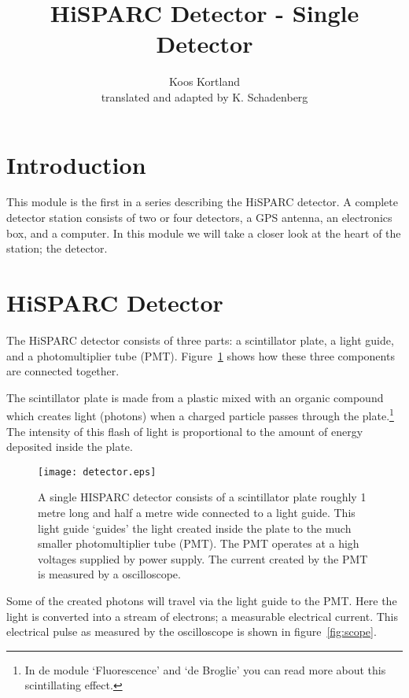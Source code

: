 


\author{Koos Kortland \\ translated and adapted by K. Schadenberg}
\date{}
\title{HiSPARC Detector - Single Detector}



\maketitle

\section{Introduction}
This module is the first in a series describing the HiSPARC detector. A complete detector station consists of two or four detectors, a GPS antenna, an electronics box, and a computer. In this module we will take a closer look at the heart of the station; the detector. 

\section{HiSPARC Detector}
The HiSPARC detector consists of three parts: a scintillator plate, a light guide, and a photomultiplier tube (PMT). Figure~\ref{fig:detector} shows how these three components are connected together.

The scintillator plate is made from a plastic mixed with an organic compound which creates light (photons) when a charged particle passes through the plate.\footnote{In de module `Fluorescence' and `de Broglie' you can read more about this scintillating effect.} The intensity of this flash of light is proportional to the amount of energy deposited inside the plate.

\begin{figure}\begin{center}
\texttt{[image: detector.eps]}%
\caption{A single HISPARC detector consists of a scintillator plate roughly 1 metre long and half a metre wide connected to a light guide. This light guide `guides' the light created inside the plate to the much smaller photomultiplier tube (PMT). The PMT operates at a high voltages supplied by power supply. The current created by the PMT is measured by a oscilloscope.}\label{fig:detector}
\end{center}\end{figure}

Some of the created photons will travel via the light guide to the PMT. Here the light is converted into a stream of electrons; a measurable electrical current. This electrical pulse as measured by the oscilloscope is shown in figure~\ref{fig:scope}.

